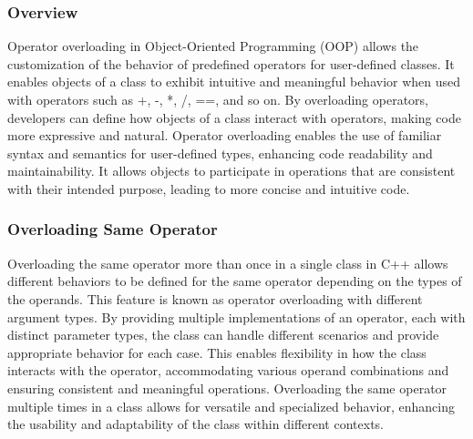 \subsubsection*{Overview}

Operator overloading in Object-Oriented Programming (OOP) allows the customization of the behavior of predefined operators for user-defined classes. It enables objects of a class to exhibit intuitive and meaningful behavior when used with operators such as +, -, *, /, ==, and so on. By overloading operators, 
developers can define how objects of a class interact with operators, making code more expressive and natural. Operator overloading enables the use of familiar syntax and semantics for user-defined types, enhancing code readability and maintainability. It allows objects to participate in operations that are 
consistent with their intended purpose, leading to more concise and intuitive code. \\

\subsubsection*{Overloading Same Operator}

Overloading the same operator more than once in a single class in C++ allows different behaviors to be defined for the same operator depending on the types of the operands. This feature is known as operator overloading with different argument types. By providing multiple implementations of an operator, each 
with distinct parameter types, the class can handle different scenarios and provide appropriate behavior for each case. This enables flexibility in how the class interacts with the operator, accommodating various operand combinations and ensuring consistent and meaningful operations. Overloading the same operator 
multiple times in a class allows for versatile and specialized behavior, enhancing the usability and adaptability of the class within different contexts. \\

